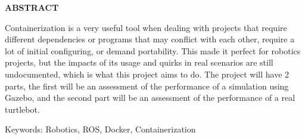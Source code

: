 \centerline{\bfseries ABSTRACT}
\label{abstract}
\vspace{8mm}

Containerization is a very useful tool when dealing with projects that require different dependencies or programs that may conflict with each other, require a lot of initial configuring, or demand portability. This made it perfect for robotics projects, but the impacts of its usage and quirks in real scenarios are still undocumented, which is what this project aims to do. The project will have 2 parts, the first will be an assessment of the performance of a simulation using Gazebo, and the second part will be an assessment of the performance of a real turtlebot.

Keywords: Robotics, ROS, Docker, Containerization